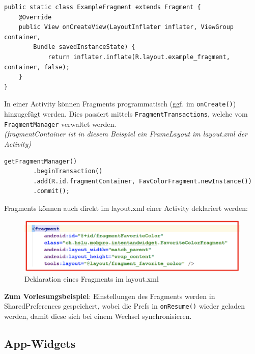 \documentclass[a4paper]{article}
\begin{document}
		\begin{lstlisting}
public static class ExampleFragment extends Fragment {
	@Override
	public View onCreateView(LayoutInflater inflater, ViewGroup container, 
		Bundle savedInstanceState) {
			return inflater.inflate(R.layout.example_fragment, container, false);
	}
}
		\end{lstlisting}
		\noindent
		In einer Activity können Fragments programmatisch (ggf. im \texttt{onCreate()}) hinzugefügt werden.
		Dies passiert mittels \texttt{FragmentTransactions}, welche vom \texttt{FragmentManager} verwaltet werden.\\
		\textit{(fragmentContainer ist in diesem Beispiel ein FrameLayout im layout.xml der Activity)}
		
		\begin{lstlisting}
getFragmentManager()
		.beginTransaction()
		.add(R.id.fragmentContainer, FavColorFragment.newInstance())
		.commit();
		\end{lstlisting}
		\noindent
		Fragments können auch direkt im layout.xml einer Activity deklariert werden:
		
		\begin{figure}[!htb]
			\centering
			\includegraphics[width=.7\textwidth]{img/android6/fragment_xml.png}
			\caption{Deklaration eines Fragments im layout.xml}
			\label{fig:fragment_xml}
		\end{figure}
		\noindent
		\textbf{Zum Vorlesungsbeispiel}: Einstellungen des Fragments werden in SharedPreferences gespeichert, wobei die Prefs in \texttt{onResume()} wieder geladen werden, damit diese sich bei einem Wechsel synchronisieren.
	
	\subsection{App-Widgets}
	
\end{document}
